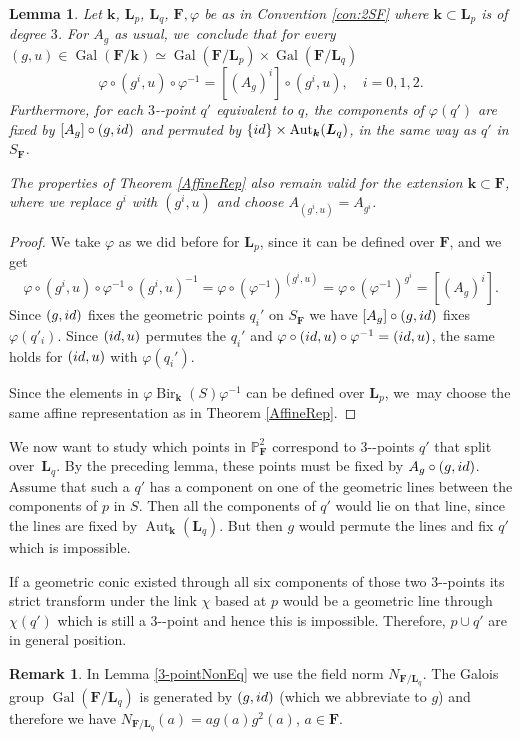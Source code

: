 \documentclass[10pt,a4paper]{amsart}
\providecommand{\nobreakdash}{\nobreak\hbox{-}}
\newcommand{\id}{\textup{id}}
\DeclareMathOperator{\Gal}{Gal}
\newtheorem{lemma}[theorem]{Lemma}
\theoremstyle{definition}
\newtheorem{remark}[theorem]{Remark}
\newcommand{\kk}{{\boldsymbol{k}}}
\newcommand{\FF}{{\boldsymbol{F}}}
\newcommand{\LL}{{\boldsymbol{L}}}
\DeclareMathOperator{\Bir}{Bir}
\DeclareMathOperator{\Aut}{Aut}
\begin{document}
\begin{lemma}
Let $\kk$, $\LL_p$, $\LL_q$, $\FF, \varphi$ be as in Convention \ref{con:2SF} where $\kk \subset \LL_p$ is of degree $3$. For $A_g$ as usual, we~conclude that for every $(g,u) \in \Gal(\FF/\kk) \simeq \Gal(\FF/\LL_p) \times \Gal(\FF/\LL_q)$
\[
\varphi \circ (g^i,u) \circ \varphi^{-1} = [(A_g)^i] \circ (g^i,u), \quad i = 0,1,2.
\]
Furthermore, for each $3$\nobreakdash-point $q'$ equivalent to $q$, the components of $\varphi(q')$ are fixed by $[A_g] \circ (g,\id)$ and permuted by $\{ \id \} \times \Aut_{\kk}(\LL_q)$, in the same way as $q'$ in $S_{\FF}$.

The properties of Theorem \ref{AffineRep} also remain valid for the extension $\kk \subset \FF$, where we replace $g^{i}$ with $(g^{i},u)$ and choose $A_{(g^i,u)} = A_{g^i}$.
\end{lemma}

\begin{proof}
We take $\varphi$ as we did before for $\LL_p$, since it can be defined over $\FF$, and we get
\[
\varphi \circ (g^i,u) \circ \varphi^{-1} \circ (g^i,u)^{-1} = \varphi \circ (\varphi^{-1})^{(g^i,u)} = \varphi \circ (\varphi^{-1})^{g^i} = [(A_g)^i].
\]
Since $(g,\id)$ fixes the geometric points $q_i'$ on $S_{\FF}$ we have $[A_g] \circ (g,\id)$ fixes $\varphi(q'_i)$. Since $(\id,u)$ permutes the $q_i'$ and $\varphi \circ (\id,u) \circ \varphi^{-1} = (\id,u)$, the same holds for $(\id,u)$ with $\varphi(q_i')$.

Since the elements in $\varphi \Bir_{\kk}(S) \varphi^{-1}$ can be defined over $\LL_p$, we~may choose the same affine representation as in Theorem \ref{AffineRep}.
\end{proof}

We now want to study which points in $\mathbb{P}^2_{\FF}$ correspond to $3$\nobreakdash-points $q'$ that split over~$\LL_q$. By the preceding lemma, these points must be fixed by $A_g \circ (g,\id)$. Assume that such a $q'$ has a component on one of the geometric lines between the components of $p$ in $S$. Then all the components of $q'$ would lie on that line, since the lines are fixed by $\Aut_{\kk}(\LL_q)$. But then $g$ would permute the lines and fix $q'$ which is impossible.

If a geometric conic existed through all six components of those two $3$\nobreakdash-points its strict transform under the link $\chi$ based at $p$ would be a geometric line through $\chi(q')$ which is still a $3$\nobreakdash-point and hence this is impossible. Therefore, $p \cup q'$ are in general position.
\begin{remark}
In Lemma \ref{3-pointNonEq} we use the field norm $N_{\FF/\LL_q}$. The Galois group $\Gal(\FF/\LL_q)$ is generated by $(g,\id)$ (which we abbreviate to $g$) and therefore we have $N_{\FF/\LL_q}(a) = a g(a)g^2(a)$, $a \in \FF$.
\end{remark}
\end{document}
